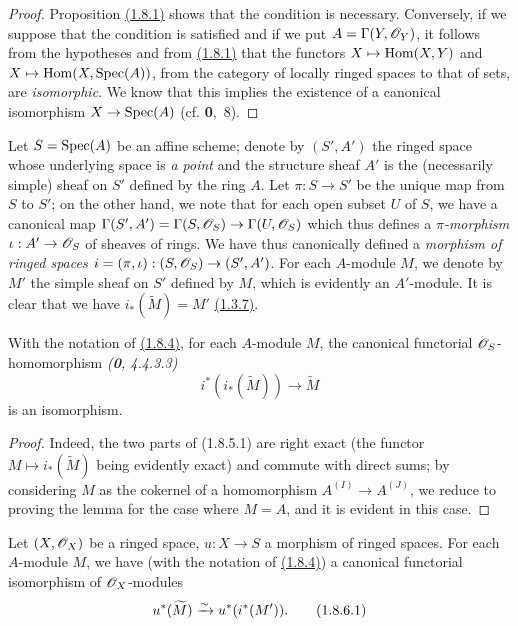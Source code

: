\begin{proof}
\label{proof-cor-1.1.8.3}
Proposition \hyperref[prop-1.1.8.1]{(1.8.1)} shows that the condition is necessary. Conversely, if we
suppose that the condition is satisfied and if we put $A=\Gamma(Y,\mathscr{O}_Y)$, it follows from
the hypotheses and from \hyperref[prop-1.1.8.1]{(1.8.1)} that the functors $X\mapsto{\mathop{\mathrm{Hom}}\nolimits}(X,Y)$ and
$X\mapsto{\mathop{\mathrm{Hom}}\nolimits}(X,{\mathop{\mathrm{Spec}}\nolimits}(A))$, from the category of locally ringed spaces to that of sets, are
{\em isomorphic}. We know that this implies the existence of a canonical isomorphism
$X\to{\mathop{\mathrm{Spec}}\nolimits}(A)$ (cf. \textbf{0},~8).
\end{proof}

\begin{env}[1.8.4]
\label{env-1.1.8.4}
Let $S={\mathop{\mathrm{Spec}}\nolimits}(A)$ be an affine scheme; denote by $(S',A')$ the ringed space whose underlying
space is {\em a point} and the structure sheaf $A'$ is the (necessarily simple)
sheaf on $S'$ defined by the ring $A$. Let $\pi:S\to S'$ be the unique map from $S$ to $S'$;
on the other hand, we note that for each open subset $U$ of $S$, we have a canonical map
$\Gamma(S',A')=\Gamma(S,\mathscr{O}_S)\to\Gamma(U,\mathscr{O}_S)$ which thus defines a {\em $\pi$-morphism}
$\iota:A'\to\mathscr{O}_S$ of sheaves of rings. We have thus canonically defined a {\em morphism of
ringed spaces $i=(\pi,\iota):(S,\mathscr{O}_S)\to(S',A')$}. For each $A$-module $M$, we denote by
$M'$ the simple sheaf on $S'$ defined by $M$, which is evidently an $A'$-module. It is clear
that we have $i_*(\widetilde{M})=M'$ \hyperref[thm-1.1.3.7]{(1.3.7)}.
\end{env}

\begin{lem}[1.8.5]
\label{lem-1.1.8.5}
With the notation of \hyperref[env-1.1.8.4]{(1.8.4)}, for each $A$-module $M$, the canonical functorial
$\mathscr{O}_S$-homomorphism {\em (\textbf{0}, 4.4.3.3)}
\[
  i^*(i_*(\widetilde{M}))\longrightarrow\widetilde{M}
  \tag{1.8.5.1}
\]
is an isomorphism.
\end{lem}

\begin{proof}
\label{proof-lem-1.1.8.5}
Indeed, the two parts of (1.8.5.1) are right exact (the functor
$M\mapsto i_*(\widetilde{M})$ being evidently exact) and commute with direct sums; by
considering $M$ as the cokernel of a homomorphism $A^{(I)}\to A^{(J)}$, we reduce to proving
the lemma for the case where $M=A$, and it is evident in this case.
\end{proof}

\begin{cor}[1.8.6]
\label{cor-1.1.8.6}
Let $(X,\mathscr{O}_X)$ be a ringed space, $u:X\to S$ a morphism of ringed spaces.
For each $A$-module $M$, we have (with the notation of \hyperref[env-1.1.8.4]{(1.8.4)}) a canonical
functorial isomorphism of $\mathscr{O}_X$-modules
\[
  u^*(\widetilde{M})\xrightarrow{\sim} u^*(i^*(M')).
  \tag{1.8.6.1}
\]
\end{cor}

